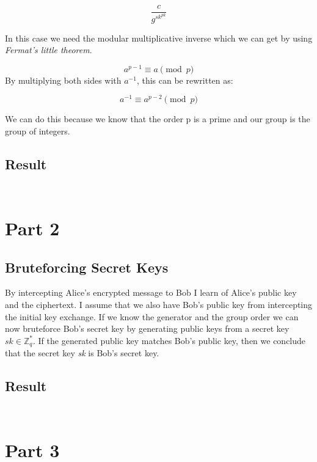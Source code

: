 \documentclass{article}
\begin{document}
\[\frac{c}{g^{sk^{pk}}}\]

In this case we need the modular multiplicative inverse which we can get by using \textit{Fermat's little theorem}.

\[a^{p-1} \equiv a \pmod p\]
By multiplying both sides with \(a^{-1}\), this can be rewritten as:

\[a^{-1} \equiv a^{p-2} \pmod p\]

We can do this because we know that the order p is a prime and our group is the group of integers.


\subsection{Result}
\label{subsec:result1}

\inputminted[linenos,lastline=21]{Python}{mandatory_exercise_1.py}
\inputminted[linenos,firstline=31,lastline=41]{Python}{mandatory_exercise_1.py}



\section{Part 2}

\subsection{Bruteforcing Secret Keys}
By intercepting Alice's encrypted message to Bob I learn of Alice's public key and the ciphertext.
I assume that we also have Bob's public key from intercepting the initial key exchange.
If we know the generator and the group order we can now bruteforce Bob's secret key by generating public keys from a secret key \(sk \in \mathbb{Z}^{*}_q\). If the generated public key matches Bob's public key, then we conclude that the secret key \textit{sk} is Bob's secret key.


\subsection{Result}
\label{subsec:result2}

\inputminted[linenos,firstline=22,lastline=28]{Python}{mandatory_exercise_1.py}
\inputminted[linenos,firstline=43,lastline=52]{Python}{mandatory_exercise_1.py}

\newpage

\section{Part 3}
\end{document}
